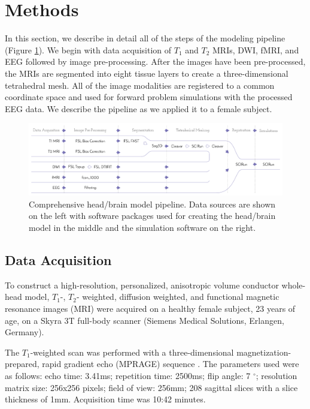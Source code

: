 
\section{Methods}
\label{sec:Methods}

In this section, we describe in detail all of the steps of the modeling pipeline (Figure \ref{fig:pipeline}). We begin with data acquisition of $T_1$ and $T_2$ MRIs, DWI, fMRI, and EEG followed by image pre-processing. After the images have been pre-processed, the MRIs are segmented into eight tissue layers to create a three-dimensional tetrahedral mesh. All of the image modalities are registered to a common coordinate space and used for forward problem simulations with the processed EEG data. We describe the pipeline as we applied it to a female subject. 

\begin{figure}[H]
    \centering
    \includegraphics[width=\textwidth]{Figures/pipeline}
    \caption{Comprehensive head/brain model pipeline. Data sources are shown on the left with software packages used for creating the head/brain model in the middle and the simulation software on the right.}
    \label{fig:pipeline}
\end{figure}

\subsection{Data Acquisition}
\label{sec:Data}


To construct a high-resolution, personalized, anisotropic volume conductor whole-head model, $T_1$-, $T_2$- weighted, diffusion weighted, and functional magnetic resonance images (MRI) were acquired on a healthy female subject, 23 years of age, on a Skyra 3T full-body scanner (Siemens Medical Solutions, Erlangen, Germany).

The $T_1$-weighted scan was performed with a three-dimensional magnetization-prepared, rapid gradient echo (MPRAGE) sequence \cite{ref:mprage}. The parameters used were as follows: echo time: 3.41ms; repetition time: 2500ms; flip angle: 7 $^{\circ}$; resolution matrix size: 256x256 pixels; field of view: 256mm; 208 sagittal slices with a slice thickness of 1mm. Acquisition time was 10:42 minutes.


